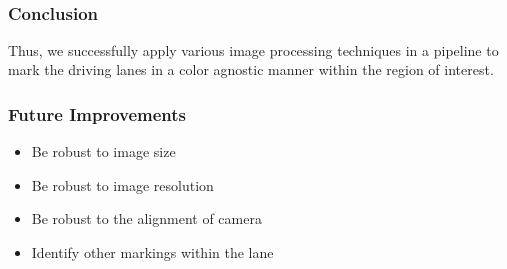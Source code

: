 \documentclass[11pt]{article}
\providecommand{\tightlist}{%
      \setlength{\itemsep}{0pt}\setlength{\parskip}{0pt}}
\begin{document}
    \begin{center}
    \end{center}
    { \hspace*{\fill} \\}
    
    \hypertarget{conclusion}{%
\subsubsection{Conclusion}\label{conclusion}}

Thus, we successfully apply various image processing techniques in a
pipeline to mark the driving lanes in a color agnostic manner within the
region of interest.

    \hypertarget{future-improvements}{%
\subsubsection{Future Improvements}\label{future-improvements}}

\begin{itemize}
\tightlist
\item
  Be robust to image size
\item
  Be robust to image resolution
\item
  Be robust to the alignment of camera
\item
  Identify other markings within the lane
\end{itemize}


    
    
    
    
\end{document}
